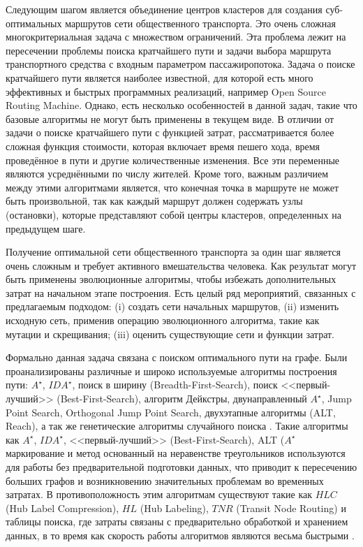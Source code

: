 Следующим шагом является объединение центров кластеров для создания суб- оптимальных маршрутов сети 
общественного транспорта. Это очень сложная многокритериальная задача с множеством ограничений. Эта проблема 
лежит на пересечении проблемы поиска кратчайшего пути и задачи выбора маршрута транспортного средства с 
входным параметром пассажиропотока. Задача о поиске кратчайшего пути является наиболее известной, для которой 
есть много эффективных и быстрых программных реализаций, например Open Source Routing Machine\cite{osrm}. 
Однако, есть несколько особенностей в данной задач, такие что базовые алгоритмы не могут быть применены в 
текущем виде. В отличии от задачи о поиске кратчайшего пути с функцией затрат, рассматривается более сложная 
функция стоимости, которая включает время пешего хода, время проведённое в пути и другие количественные 
изменения. Все эти переменные являются усреднёнными по числу жителей. Кроме того, важным различием между этими 
алгоритмами является, что конечная точка в маршруте не может быть произвольной, так как каждый маршрут должен 
содержать узлы (остановки), которые представляют собой центры кластеров, определенных на предыдущем шаге.

Получение оптимальной сети общественного транспорта за один шаг является очень сложным и требует активного 
вмешательства человека. Как результат могут быть применены эволюционные алгоритмы, чтобы избежать 
дополнительных затрат на начальном этапе построения. Есть целый ряд мероприятий, связанных с предлагаемым 
подходом: (i) создать сети начальных маршрутов, (ii) изменить исходную сеть, применив операцию эволюционного 
алгоритма, такие как мутации и скрещивания; (iii) оценить существующие сети и функции затрат.

Формально данная задача связана с поиском оптимального пути на графе. Были проанализированы различные и 
широко используемые алгоритмы построения пути: \( A^\star \), \( IDA^\star \), поиск в ширину 
(Breadth-First-Search), поиск <<первый-лучший>> (Best-First-Search), алгоритм Дейкстры, двунаправленный 
\( A^\star \), Jump Point Search, Orthogonal Jump Point Search, двухэтапные алгоритмы (ALT, Reach), а 
так же генетические алгоритмы случайного поиска \cite{bib:19}.  Такие алгоритмы как \( A^\star \), 
\( IDA^\star \), <<первый-лучший>> (Best-First-Search), ALT (\( A^\star \) маркирование и метод основанный на 
неравенстве треугольников используются для работы без предварительной подготовки данных, что приводит к 
пересечению больших графов и возникновению значительных проблемам во временных затратах. В противоположность 
этим алгоритмам существуют такие как \( HLC \) (Hub Label Compression), \( HL \) (Hub Labeling), 
\( TNR \) (Transit Node Routing) и таблицы поиска, где затраты связаны с предварительно обработкой и 
хранением данных, в то время как скорость работы алгоритмов являются весьма быстрыми \cite{bib:21}.

